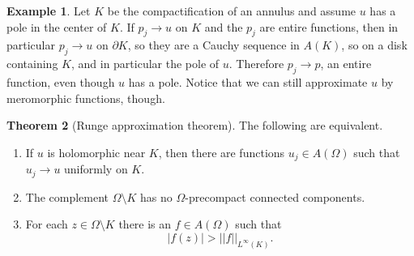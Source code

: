 \documentclass[12pt]{report}
\theoremstyle{definition}
\newtheorem{theorem}{Theorem}[chapter]
\newtheorem{example}[theorem]{Example}
\begin{document}
\begin{example}
    Let $K$ be the compactification of an annulus and assume $u$ has a pole in the center of $K$. If $p_j \to u$ on $K$ and the $p_j$ are entire functions, then in particular $p_j \to u$ on $\partial K$, so they are a Cauchy sequence in $A(K)$, so on a disk containing $K$, and in particular the pole of $u$. Therefore $p_j \to p$, an entire function, even though $u$ has a pole. Notice that we can still approximate $u$ by meromorphic functions, though.
\end{example}
\begin{theorem}[Runge approximation theorem]
    The following are equivalent.
\begin{enumerate}
    \item If $u$ is holomorphic near $K$, then there are functions $u_j \in A(\Omega)$ such that $u_j \to u$ uniformly on $K$.
    \item The complement $\Omega \setminus K$ has no $\Omega$-precompact connected components.
    \item For each $z \in \Omega \setminus K$ there is an $f \in A(\Omega)$ such that
    $$|f(z)| > ||f||_{L^\infty(K)}.$$
\end{enumerate}
\end{theorem}
\end{document}
